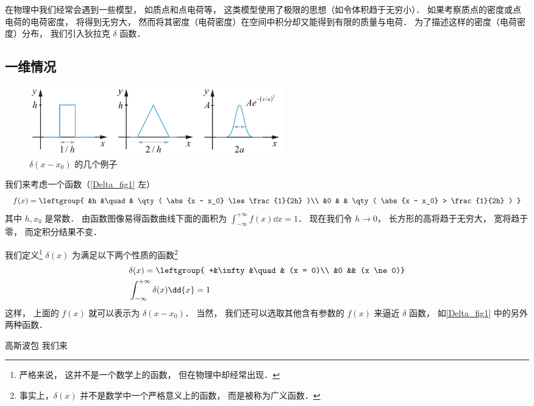 
在物理中我们经常会遇到一些模型， 如质点和点电荷等， 这类模型使用了极限的思想（如令体积趋于无穷小）． 如果考察质点的密度或点电荷的电荷密度， 将得到无穷大， 然而将其密度（电荷密度）在空间中积分却又能得到有限的质量与电荷． 为了描述这样的密度（电荷密度）分布， 我们引入狄拉克 $\delta$ 函数．

\subsection{一维情况}

\begin{figure}[ht]
\centering
\includegraphics[width=11cm]{./figures/Delta1.pdf}
\caption{$\delta(x - x_0)$ 的几个例子} \label{Delta_fig1}
\end{figure}

我们来考虑一个函数（\autoref{Delta_fig1} 左）
\begin{equation}
f(x) = \leftgroup{
&h &\quad & \qty( \abs{x - x_0} \les \frac{1}{2h} )\\
&0 &          & \qty( \abs{x - x_0} > \frac{1}{2h} )
}\end{equation}
其中 $h, x_0$ 是常数． 由函数图像易得函数曲线下面的面积为 $\int_{-\infty}^{+\infty} f(x) \dd{x} = 1$． 现在我们令 $h \to 0$， 长方形的高将趋于无穷大， 宽将趋于零， 而定积分结果不变．

我们定义\footnote{严格来说， 这并不是一个数学上的函数， 但在物理中却经常出现．} $\delta(x)$ 为满足以下两个性质的函数\footnote{事实上，$\delta(x)$ 并不是数学中一个严格意义上的函数， 而是被称为广义函数．}
\begin{align}
&\delta(x) = \leftgroup{
+&\infty &\quad& (x = 0)\\
&0 && (x \ne 0)}\label{Delta_eq2}\\
&\int_{-\infty}^{+\infty} \delta(x) \dd{x} = 1\label{Delta_eq3}
\end{align}
这样， 上面的 $f(x)$ 就可以表示为 $\delta(x - x_0)$． 当然， 我们还可以选取其他含有参数的 $f(x)$ 来逼近 $\delta$ 函数， 如\autoref{Delta_fig1} 中的另外两种函数．

\begin{exam}{高斯波包}
我们来
\end{exam}

